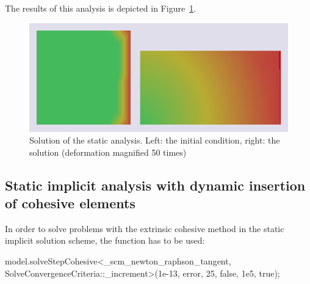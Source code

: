 The results of this analysis is depicted in
Figure~\ref{fig:smm:implicit:static_solution}.

\begin{figure}[!htb]
  \centering
  \includegraphics[width=.7\linewidth]{figures/static_analysis}
  \caption{Solution of the static analysis. Left: the initial
condition, right: the solution (deformation magnified 50 times)}
  \label{fig:smm:implicit:static_solution}
\end{figure}


\subsection{Static implicit analysis with dynamic insertion of cohesive elements}
In order to solve problems with the extrinsic cohesive method in the
static implicit solution scheme, the function 
has to be used:
\begin{cpp}
model.solveStepCohesive<_scm_newton_raphson_tangent, SolveConvergenceCriteria::_increment>(1e-13, error, 25, false, 1e5, true);
\end{cpp}

